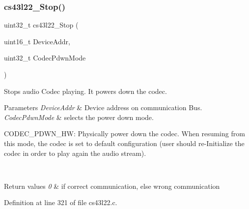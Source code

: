 \subsubsection{\texorpdfstring{cs43l22\+\_\+\+Stop()}{cs43l22\_Stop()}}
{\footnotesize\ttfamily uint32\+\_\+t cs43l22\+\_\+\+Stop (\begin{DoxyParamCaption}\item[{uint16\+\_\+t}]{Device\+Addr,  }\item[{uint32\+\_\+t}]{Codec\+Pdwn\+Mode }\end{DoxyParamCaption})}



Stops audio Codec playing. It powers down the codec. 


\begin{DoxyParams}{Parameters}
{\em Device\+Addr} & Device address on communication Bus. \\
\hline
{\em Codec\+Pdwn\+Mode} & selects the power down mode.
\begin{DoxyItemize}
\item C\+O\+D\+E\+C\+\_\+\+P\+D\+W\+N\+\_\+\+HW\+: Physically power down the codec. When resuming from this mode, the codec is set to default configuration (user should re-\/\+Initialize the codec in order to play again the audio stream). 
\end{DoxyItemize}\\
\hline
\end{DoxyParams}

\begin{DoxyRetVals}{Return values}
{\em 0} & if correct communication, else wrong communication \\
\hline
\end{DoxyRetVals}


Definition at line 321 of file cs43l22.\+c.

